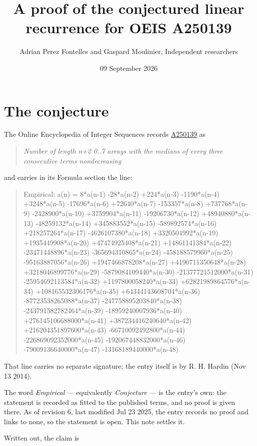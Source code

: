 \documentclass[11pt]{article}
\title{A proof of the conjectured linear recurrence for OEIS A250139}
\author{Adrian Perez Fontelles and Gaspard Moulinier, Independent researchers}
\date{09 September 2026}
\theoremstyle{definition}
\begin{document}
\maketitle
\section{The conjecture}

The Online Encyclopedia of Integer Sequences records \href{https://oeis.org/A250139}{A250139} as

\begin{quote}\itshape Number of length n+2 0..7 arrays with the medians of every three consecutive terms nondecreasing\end{quote}

and carries in its Formula section the line:

\begin{quote}\ttfamily Empirical: a(n) = 8*a(n-1) -28*a(n-2) +224*a(n-3) -1190*a(n-4) +3248*a(n-5) -17696*a(n-6) +72640*a(n-7) -153357*a(n-8) +737768*a(n-9) -2428900*a(n-10) +3759904*a(n-11) -19206730*a(n-12) +48940880*a(n-13) -48259132*a(n-14) +345883552*a(n-15) -589892574*a(n-16) +218257264*a(n-17) -4626107380*a(n-18) +3320504992*a(n-19) +1935449908*a(n-20) +47474925408*a(n-21) +14861141384*a(n-22) -23471448896*a(n-23) -365694310865*a(n-24) -458188579960*a(n-25) -95163887056*a(n-26) +1947466878208*a(n-27) +4190711350648*a(n-28) +3218046899776*a(n-29) -5879084109440*a(n-30) -21377721512000*a(n-31) -25954692113584*a(n-32) +1197800058240*a(n-33) +62821989864576*a(n-34) +108165532306176*a(n-35) +64344143608704*a(n-36) -87723538265088*a(n-37) -247758895203840*a(n-38) -243791582782464*a(n-39) -18959240007936*a(n-40) +276145106688000*a(n-41) +387234416240640*a(n-42) +216204351897600*a(n-43) -66710092492800*a(n-44) -226869092352000*a(n-45) -192067448832000*a(n-46) -79009136640000*a(n-47) -13168189440000*a(n-48)\end{quote}

That line carries no separate signature; the entry itself is by R. H. Hardin (Nov 13 2014).

The word {\itshape Empirical} --- equivalently {\itshape Conjecture} --- is the entry's own: the statement is recorded as fitted to the published terms, and no proof is given there. As of revision 6, last modified Jul 23 2025, the entry records no proof and links to none, so the statement is open. This note settles it.

Written out, the claim is
\end{document}
